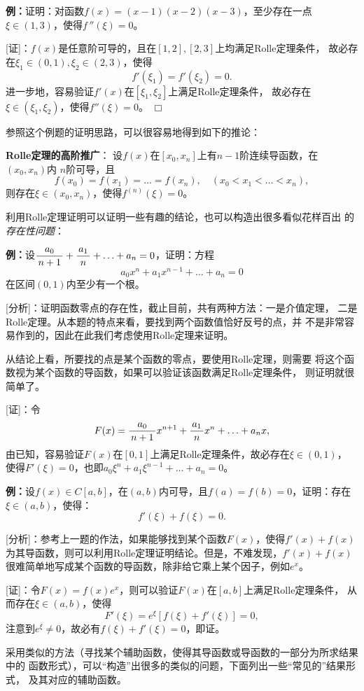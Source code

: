 {\bf 例：}证明：对函数$f(x)=(x-1)(x-2)(x-3)$，至少存在一点
$\xi\in(1,3)$，使得$f\,''(\xi)=0$。

[证]：$f(x)$是任意阶可导的，且在$[1,2],[2,3]$上均满足Rolle定理条件，
故必存在$\xi_1\in(0,1),\xi_2\in(2,3)$，使得
$$f'(\xi_1)=f'(\xi_2)=0.$$
进一步地，容易验证$f'(x)$在$[\xi_1,\xi_2]$上满足Rolle定理条件，
故必存在$\xi\in(\xi_1,\xi_2)$，使得$f''(\xi)=0$。
\hfill$\Box$

参照这个例题的证明思路，可以很容易地得到如下的推论：

\begin{thx}
	{\bf Rolle定理的高阶推广}：
	设$f(x)$在$[x_0,x_n]$上有$n-1$阶连续导函数，在$(x_0,x_n)$内
	$n$阶可导，且
	$$f(x_0)=f(x_1)=\ldots=f(x_n),\quad(x_0<x_1<\ldots<x_n),$$
	则存在$\xi\in(x_0,x_n)$，使得$f^{(n)}(\xi)=0$。
\end{thx}

利用Rolle定理证明可以证明一些有趣的结论，也可以构造出很多看似花样百出
的{\it 存在性问题}：

{\bf 例：}设$\displaystyle\frac{\,{a_0}\,}{\,{n+1}\,}+\displaystyle\frac{\,{a_1}\,}{\,{n}\,}+\ldots+a_n=0$，证明：方程
$$a_0x^n+a_1x^{n-1}+\ldots+a_n=0$$
在区间$(0,1)$内至少有一个根。

[分析]：证明函数零点的存在性，截止目前，共有两种方法：一是介值定理，
二是Rolle定理。从本题的特点来看，要找到两个函数值恰好反号的点，并
不是非常容易作到的，因此在此我们考虑使用Rolle定理来证明。

从结论上看，所要找的点是某个函数的零点，要使用Rolle定理，则需要
将这个函数视为某个函数的导函数，如果可以验证该函数满足Rolle定理条件，
则证明就很简单了。

[证]：令
$$F(x)=\displaystyle\frac{\,{a_0}\,}{\,{n+1}\,}x^{n+1}+\displaystyle\frac{\,{a_1}\,}{\,{n}\,}x^n+\ldots+a_nx,$$
由已知，容易验证$F(x)$在$[0,1]$上满足Rolle定理条件，故必存在$\xi\in(0,1)$，
使得$F'(\xi)=0$，也即$a_0\xi^n+a_1\xi^{n-1}+\ldots+a_n=0$。\fin

{\bf 例：}设$f(x)\in C[a,b]$，在$(a,b)$内可导，且$f(a)=f(b)=0$，证明：存在
$\xi\in(a,b)$，使得：
$$f'(\xi)+f(\xi)=0.$$

[分析]：参考上一题的作法，如果能够找到某个函数$F(x)$，使得$f'(x)+f(x)$
为其导函数，则可以利用Rolle定理证明结论。但是，不难发现，$f'(x)+f(x)$
很难简单地写成某个函数的导函数，除非给它乘上某个因子，例如$e^x$。

[证]：令$F(x)=f(x)e^x$，则可以验证$F(x)$在$[a,b]$上满足Rolle定理条件，
从而存在$\xi\in(a,b)$，使得
$$F'(\xi)=e^{\xi}[f(\xi)+f'(\xi)]=0,$$
注意到$e^{\xi}\ne0$，故必有$f(\xi)+f'(\xi)=0$，即证。\fin

采用类似的方法（寻找某个辅助函数，使得其导函数或导函数的一部分为所求结果中的
函数形式），可以“构造”出很多的类似的问题，下面列出一些“常见的”结果形式，
及其对应的辅助函数。

